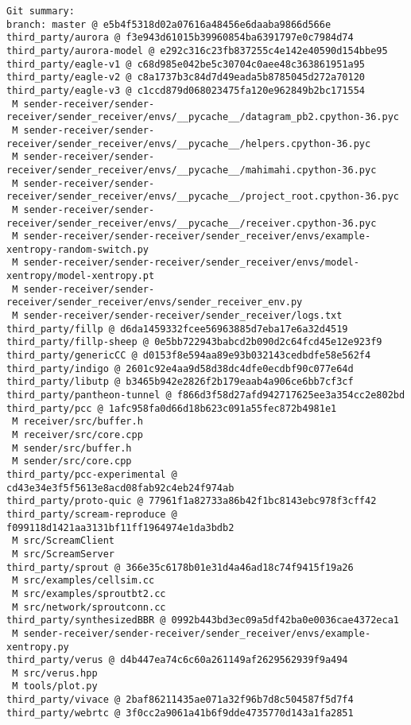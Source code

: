 \documentclass{article}
\begin{document}
\begin{verbatim}
Git summary:
branch: master @ e5b4f5318d02a07616a48456e6daaba9866d566e
third_party/aurora @ f3e943d61015b39960854ba6391797e0c7984d74
third_party/aurora-model @ e292c316c23fb837255c4e142e40590d154bbe95
third_party/eagle-v1 @ c68d985e042be5c30704c0aee48c363861951a95
third_party/eagle-v2 @ c8a1737b3c84d7d49eada5b8785045d272a70120
third_party/eagle-v3 @ c1ccd879d068023475fa120e962849b2bc171554
 M sender-receiver/sender-receiver/sender_receiver/envs/__pycache__/datagram_pb2.cpython-36.pyc
 M sender-receiver/sender-receiver/sender_receiver/envs/__pycache__/helpers.cpython-36.pyc
 M sender-receiver/sender-receiver/sender_receiver/envs/__pycache__/mahimahi.cpython-36.pyc
 M sender-receiver/sender-receiver/sender_receiver/envs/__pycache__/project_root.cpython-36.pyc
 M sender-receiver/sender-receiver/sender_receiver/envs/__pycache__/receiver.cpython-36.pyc
 M sender-receiver/sender-receiver/sender_receiver/envs/example-xentropy-random-switch.py
 M sender-receiver/sender-receiver/sender_receiver/envs/model-xentropy/model-xentropy.pt
 M sender-receiver/sender-receiver/sender_receiver/envs/sender_receiver_env.py
 M sender-receiver/sender-receiver/sender_receiver/logs.txt
third_party/fillp @ d6da1459332fcee56963885d7eba17e6a32d4519
third_party/fillp-sheep @ 0e5bb722943babcd2b090d2c64fcd45e12e923f9
third_party/genericCC @ d0153f8e594aa89e93b032143cedbdfe58e562f4
third_party/indigo @ 2601c92e4aa9d58d38dc4dfe0ecdbf90c077e64d
third_party/libutp @ b3465b942e2826f2b179eaab4a906ce6bb7cf3cf
third_party/pantheon-tunnel @ f866d3f58d27afd942717625ee3a354cc2e802bd
third_party/pcc @ 1afc958fa0d66d18b623c091a55fec872b4981e1
 M receiver/src/buffer.h
 M receiver/src/core.cpp
 M sender/src/buffer.h
 M sender/src/core.cpp
third_party/pcc-experimental @ cd43e34e3f5f5613e8acd08fab92c4eb24f974ab
third_party/proto-quic @ 77961f1a82733a86b42f1bc8143ebc978f3cff42
third_party/scream-reproduce @ f099118d1421aa3131bf11ff1964974e1da3bdb2
 M src/ScreamClient
 M src/ScreamServer
third_party/sprout @ 366e35c6178b01e31d4a46ad18c74f9415f19a26
 M src/examples/cellsim.cc
 M src/examples/sproutbt2.cc
 M src/network/sproutconn.cc
third_party/synthesizedBBR @ 0992b443bd3ec09a5df42ba0e0036cae4372eca1
 M sender-receiver/sender-receiver/sender_receiver/envs/example-xentropy.py
third_party/verus @ d4b447ea74c6c60a261149af2629562939f9a494
 M src/verus.hpp
 M tools/plot.py
third_party/vivace @ 2baf86211435ae071a32f96b7d8c504587f5d7f4
third_party/webrtc @ 3f0cc2a9061a41b6f9dde4735770d143a1fa2851
\end{verbatim}
\end{document}
